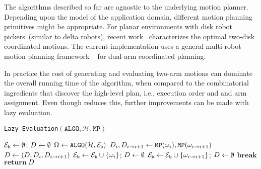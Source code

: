 The algorithms described so far are agnostic to the underlying motion planner.
Depending upon the model of the application domain, different motion planning primitives might be appropriate. For planar environments with disk robot pickers~(similar to delta robots), recent work~\cite{kirkpatrick2016characterizing} characterizes the optimal two-disk coordinated motions. The current implementation uses a general multi-robot motion planning framework \drrtstar~\cite{Dobson:2017aa} for dual-arm coordinated planning.


In practice the cost of generating and evaluating two-arm motions can dominate the overall running time of the algorithm, when compared to the combinatorial ingredients that discover the high-level plan, i.e., execution order and and arm assignment. Even though \algo reduces this, further improvements can be made with lazy evaluation. 

  \begin{algorithm}[t]
  \caption{{\tt Lazy\_Evaluation}$ (\mathtt{ALGO}, \mathcal{H}, \mathtt{MP}) $}
  \label{algo:lazy}
  $ \mathcal{E}_{\mathtt{b}}\leftarrow\emptyset $;  $ D \leftarrow \emptyset $\;
  {
      $ {{\Omega}}\leftarrow \mathtt{ALGO} ( \mathcal{H},   \mathcal{E}_{\mathtt{b}}  ) $\;
      {
          $ D_i,D_{i\rightarrow i+1} \leftarrow \mathtt{MP}({\omega}_i), \mathtt{MP}( {\omega}_{i\rightarrow{i+1}} ) $\;
          $ D\leftarrow (D,D_i,D_{i\rightarrow i+1} ) $\;
          {
              $ \mathcal{E}_{\mathtt{b}} \leftarrow \mathcal{E}_{\mathtt{b}}\cup \{{\omega}_i\}$; $ D \leftarrow \emptyset$\;
          }
          {
              $ \mathcal{E}_{\mathtt{b}} \leftarrow \mathcal{E}_{\mathtt{b}}\cup \{{\omega}_{i\rightarrow{i+1}}\}$; $D \leftarrow \emptyset $\;
          }
          \lIf{$ \D=\emptyset $}
          {
          $\mathbf{break}$
          }
      }
  }
  $\mathbf{return}\ D$
  \end{algorithm}

